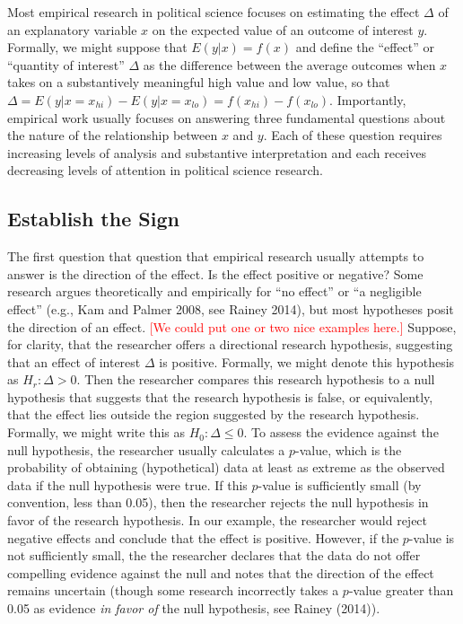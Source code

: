 \documentclass[12pt]{article}
\newcommand{\comment}[1]{\textcolor{red}{#1}}
\begin{document}
Most empirical research in political science focuses on estimating the effect $\Delta$ of an explanatory variable $x$ on the expected value of an outcome of interest $y$. Formally, we might suppose that $E(y | x) = f(x)$ and define the ``effect'' or ``quantity of interest'' $\Delta$ as the difference between the average outcomes when $x$ takes on a substantively meaningful high value and low value, so that $\Delta = E(y | x = x_{hi}) - E(y | x = x_{lo}) = f(x_{hi}) - f(x_{lo})$. Importantly, empirical work usually focuses on answering three fundamental questions about the nature of the relationship between $x$ and $y$. Each of these question requires increasing levels of analysis and substantive interpretation and each receives decreasing levels of attention in political science research.

\subsection*{Establish the Sign}

The first question that question that empirical research usually attempts to answer is the direction of the effect. Is the effect positive or negative? Some research argues theoretically and empirically for ``no effect'' or ``a negligible effect'' (e.g., Kam and Palmer 2008, see Rainey 2014), but most hypotheses posit the direction of an effect. \comment{[We could put one or two nice examples here.]} Suppose, for clarity, that the researcher offers a directional research hypothesis, suggesting that an effect of interest $\Delta$ is positive. Formally, we might denote this hypothesis as $H_r: \Delta > 0$. Then the researcher compares this research hypothesis to a null hypothesis that suggests that the research hypothesis is false, or equivalently, that the effect lies outside the region suggested by the research hypothesis. Formally, we might write this as $H_0: \Delta \leq 0$. To assess the evidence against the null hypothesis, the researcher usually calculates a $p$-value, which is the probability of obtaining (hypothetical) data at least as extreme as the observed data if the null hypothesis were true. If this $p$-value is sufficiently small (by convention, less than 0.05), then the researcher rejects the null hypothesis in favor of the research hypothesis. In our example, the researcher would reject negative effects and conclude that the effect is positive. However, if the $p$-value is not sufficiently small, the the researcher declares that the data do not offer compelling evidence against the null and notes that the direction of the effect remains uncertain (though some research incorrectly takes a $p$-value greater than 0.05 as evidence \textit{in favor of} the null hypothesis, see Rainey (2014)).
\end{document}
